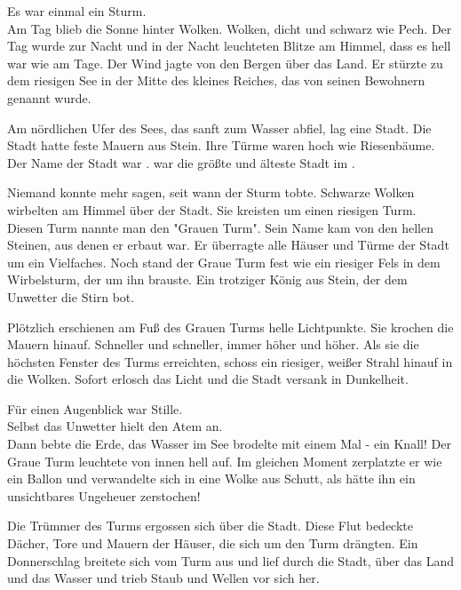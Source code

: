 





\begin{Large}
\begin{itshape}
Es war einmal ein Sturm.\\
Am Tag blieb die Sonne hinter Wolken. Wolken, dicht und schwarz wie Pech. Der Tag wurde zur Nacht und in der Nacht leuchteten Blitze am Himmel, dass es hell war wie am Tage. Der Wind jagte von den Bergen über das Land. Er stürzte zu dem riesigen See in der Mitte des kleines Reiches, das von seinen Bewohnern {\Enland} genannt wurde.

Am nördlichen Ufer des Sees, das sanft zum Wasser abfiel, lag eine Stadt. Die Stadt hatte feste Mauern aus Stein. Ihre Türme waren hoch wie Riesenbäume. Der Name der Stadt war {\Tern}. {\Tern} war die größte und älteste Stadt im {\Enland}. 

Niemand konnte mehr sagen, seit wann der Sturm tobte. Schwarze Wolken wirbelten am Himmel über der Stadt. Sie kreisten um einen riesigen Turm. Diesen Turm nannte man den "Grauen Turm". Sein Name kam von den hellen Steinen, aus denen er erbaut war. Er überragte alle Häuser und Türme der Stadt um ein Vielfaches. Noch stand der Graue Turm fest wie ein riesiger Fels in dem Wirbelsturm, der um ihn brauste. Ein trotziger König aus Stein, der dem Unwetter die Stirn bot.

Plötzlich erschienen am Fuß des Grauen Turms helle Lichtpunkte. Sie krochen die Mauern hinauf. Schneller und schneller, immer höher und höher. Als sie die höchsten Fenster des Turms erreichten, schoss ein riesiger, weißer Strahl hinauf in die Wolken. Sofort erlosch das Licht und die Stadt versank in Dunkelheit.

Für einen Augenblick war Stille.\\
Selbst das Unwetter hielt den Atem an.\\
Dann bebte die Erde, das Wasser im See brodelte mit einem Mal - ein Knall! Der Graue Turm leuchtete von innen hell auf. Im gleichen Moment zerplatzte er wie ein Ballon und verwandelte sich in eine Wolke aus Schutt, als hätte ihn ein unsichtbares Ungeheuer zerstochen! 

Die Trümmer des Turms ergossen sich über die Stadt. Diese Flut bedeckte Dächer, Tore und Mauern der Häuser, die sich um den Turm drängten. Ein Donnerschlag breitete sich vom Turm aus und lief durch die Stadt, über das Land und das Wasser und trieb Staub und Wellen vor sich her.


\end{itshape}
\end{Large}
